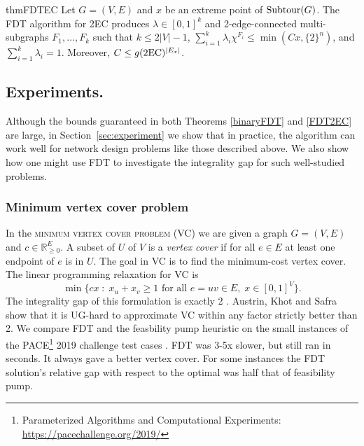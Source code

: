 \begin{restatable}{thm}{FDTEC}
	\label{FDT2EC}
	Let $G=(V,E)$ and $x$ be an extreme point of  $\operatorname{{Subtour}}(G)$. The FDT algorithm for 2EC produces $\lambda\in [0,1]^k$ and 2-edge-connected multi-subgraphs $F_1,\ldots,F_k$ such that $k\leq 2|V|-1$, $\sum_{i=1}^{k}\lambda_i \chi^{F_i}\leq \min(Cx,\{2\}^n)$, and $\sum_{i=1}^{k}\lambda_i = 1$. Moreover, $C\leq g(\2ec)^{|E_x|}$.
\end{restatable}

\subsection{Experiments.} Although the bounds guaranteed in both Theorems \ref{binaryFDT} and \ref{FDT2EC} are large, in Section~\ref{sec:experiment} we show that in practice, the algorithm can work well for network design problems like those described above. We also show how one might use FDT to investigate the integrality gap for such well-studied problems.




\subsubsection{Minimum vertex cover problem}

In the \textsc{minimum vertex cover problem (VC)} we are given a graph $G=(V,E)$ and $c\in \mathbb{R}^E_{\geq 0}$. A subset of $U$ of $V$ is a \textit{vertex cover} if for all $e\in E$ at least one endpoint of $e$ is in $U$. The goal in VC is to find the minimum-cost vertex cover. The linear programming relaxation for VC is
\begin{equation}
\min \{cx \; : \; x_u + x_v \geq	 1 \text{ for all } e=uv \in E, \; x\in [0,1]^{V}\}.
\end{equation}
The integrality gap of this formulation is exactly 2 \cite{davids}. Austrin, Khot and Safra~\cite{UGhardVC} show that it is UG-hard to approximate VC within any factor strictly better than 2. We compare  FDT and the feasbility pump heuristic \cite{fp1} on the small instances of the PACE\footnote{ Parameterized Algorithms and Computational Experiments: \url{https://pacechallenge.org/2019/}} 2019 challenge test cases \cite{PACE}. FDT was 3-5x slower, but still ran in seconds. It always gave a better vertex cover. For some instances the FDT solution's relative gap with respect to the optimal was half that of feasibility pump.
